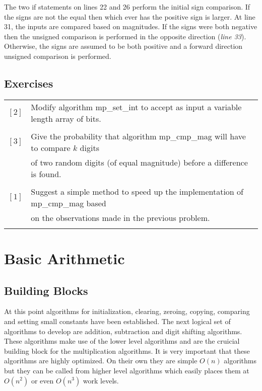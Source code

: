 \documentclass[b5paper]{book}
\begin{document}
The two if statements on lines 22 and 26 perform the initial sign comparison.  If the signs are not the equal then which ever
has the positive sign is larger.   At line 31, the inputs are compared based on magnitudes.  If the signs were both negative then 
the unsigned comparison is performed in the opposite direction (\textit{line 33}).  Otherwise, the signs are assumed to 
be both positive and a forward direction unsigned comparison is performed.

\section*{Exercises}
\begin{tabular}{cl}
$\left [ 2 \right ]$ & Modify algorithm mp\_set\_int to accept as input a variable length array of bits. \\
                     & \\
$\left [ 3 \right ]$ & Give the probability that algorithm mp\_cmp\_mag will have to compare $k$ digits  \\
                     & of two random digits (of equal magnitude) before a difference is found. \\
                     & \\
$\left [ 1 \right ]$ & Suggest a simple method to speed up the implementation of mp\_cmp\_mag based  \\
                     & on the observations made in the previous problem. \\
                     &
\end{tabular}

\chapter{Basic Arithmetic}
\section{Building Blocks}
At this point algorithms for initialization, clearing, zeroing, copying, comparing and setting small constants have been 
established.  The next logical set of algorithms to develop are addition, subtraction and digit shifting algorithms.  These 
algorithms make use of the lower level algorithms and are the cruicial building block for the multiplication algorithms.  It is very important 
that these algorithms are highly optimized.  On their own they are simple $O(n)$ algorithms but they can be called from higher level algorithms 
which easily places them at $O(n^2)$ or even $O(n^3)$ work levels.  
\end{document}
